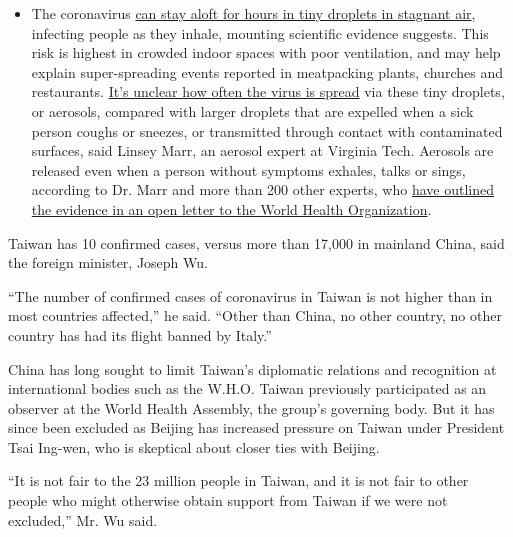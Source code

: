 \begin{itemize}
  \begin{itemize}
  \tightlist
  \item
    The coronavirus
    \href{https://www.nytimes3xbfgragh.onion/2020/07/04/health/239-experts-with-one-big-claim-the-coronavirus-is-airborne.html?action=click\&pgtype=Article\&state=default\&region=MAIN_CONTENT_3\&context=storylines_faq}{can
    stay aloft for hours in tiny droplets in stagnant air}, infecting
    people as they inhale, mounting scientific evidence suggests. This
    risk is highest in crowded indoor spaces with poor ventilation, and
    may help explain super-spreading events reported in meatpacking
    plants, churches and restaurants.
    \href{https://www.nytimes3xbfgragh.onion/2020/07/06/health/coronavirus-airborne-aerosols.html?action=click\&pgtype=Article\&state=default\&region=MAIN_CONTENT_3\&context=storylines_faq}{It's
    unclear how often the virus is spread} via these tiny droplets, or
    aerosols, compared with larger droplets that are expelled when a
    sick person coughs or sneezes, or transmitted through contact with
    contaminated surfaces, said Linsey Marr, an aerosol expert at
    Virginia Tech. Aerosols are released even when a person without
    symptoms exhales, talks or sings, according to Dr. Marr and more
    than 200 other experts, who
    \href{https://academic.oup.com/cid/article/doi/10.1093/cid/ciaa939/5867798}{have
    outlined the evidence in an open letter to the World Health
    Organization}.
  \end{itemize}
\end{itemize}

Taiwan has 10 confirmed cases, versus more than 17,000 in mainland
China, said the foreign minister, Joseph Wu.

``The number of confirmed cases of coronavirus in Taiwan is not higher
than in most countries affected,'' he said. ``Other than China, no other
country, no other country has had its flight banned by Italy.''

China has long sought to limit Taiwan's diplomatic relations and
recognition at international bodies such as the W.H.O. Taiwan previously
participated as an observer at the World Health Assembly, the group's
governing body. But it has since been excluded as Beijing has increased
pressure on Taiwan under President Tsai Ing-wen, who is skeptical about
closer ties with Beijing.

``It is not fair to the 23 million people in Taiwan, and it is not fair
to other people who might otherwise obtain support from Taiwan if we
were not excluded,'' Mr. Wu said.

